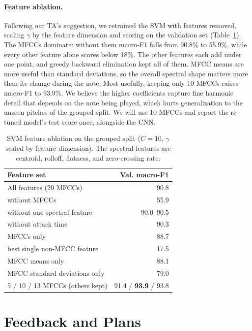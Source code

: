 \documentclass[11pt]{article}
\begin{document}
\paragraph{Feature ablation.} Following our TA's suggestion, we retrained the SVM with features removed, scaling $\gamma$ by the feature dimension and scoring on the validation set (Table~\ref{tab:ablation}). The MFCCs dominate: without them macro-F1 falls from 90.8\% to 55.9\%, while every other feature alone scores below 18\%. The other features each add under one point, and greedy backward elimination kept all of them. MFCC means are more useful than standard deviations, so the overall spectral shape matters more than its change during the note. Most usefully, keeping only 10 MFCCs raises macro-F1 to 93.9\%. We believe the higher coefficients capture fine harmonic detail that depends on the note being played, which hurts generalization to the unseen pitches of the grouped split. We will use 10 MFCCs and report the re-tuned model's test score once, alongside the CNN.

\begin{table}[t]
  \centering
  \small
  \begin{tabular}{lr}
    \hline
    \textbf{Feature set} & \textbf{Val. macro-F1} \\
    \hline
    All features (20 MFCCs)            & 90.8 \\
    \quad without MFCCs                 & 55.9 \\
    \quad without one spectral feature  & 90.0--90.5 \\
    \quad without attack time           & 90.3 \\
    \quad MFCCs only                    & 88.7 \\
    \quad best single non-MFCC feature  & 17.5 \\
    \quad MFCC means only               & 88.1 \\
    \quad MFCC standard deviations only & 79.0 \\
    \hline
    5 / 10 / 13 MFCCs (others kept)    & 91.4 / \textbf{93.9} / 93.8 \\
    \hline
  \end{tabular}
  \caption{\label{tab:ablation}
    SVM feature ablation on the grouped split ($C = 10$, $\gamma$ scaled by feature dimension). The spectral features are centroid, rolloff, flatness, and zero-crossing rate.
  }
\end{table}

\section{Feedback and Plans}
\label{sec:feedback}
\end{document}
